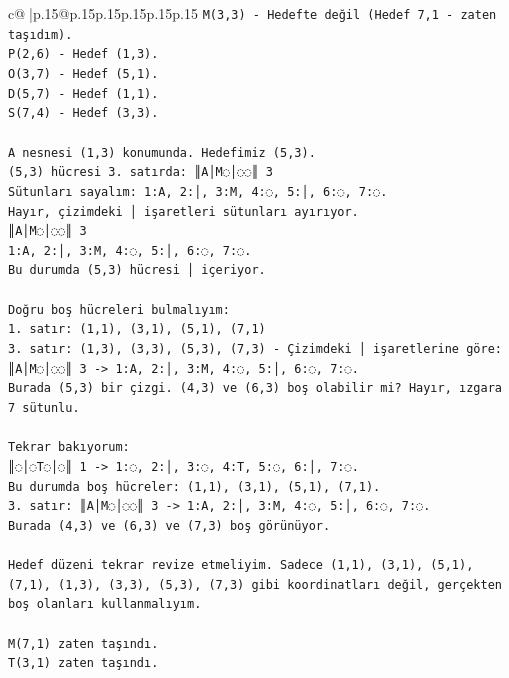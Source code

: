 \documentclass{article}
\begin{document}
{\begin{supertabular}{c@{$\;$}|p{.15\linewidth}@{}p{.15\linewidth}p{.15\linewidth}p{.15\linewidth}p{.15\linewidth}p{.15\linewidth}}
{{{\texttt{M(3,3) {-} Hedefte değil (Hedef 7,1 {-} zaten taşıdım).} \\
\texttt{P(2,6) {-} Hedef (1,3).} \\
\texttt{O(3,7) {-} Hedef (5,1).} \\
\texttt{D(5,7) {-} Hedef (1,1).} \\
\texttt{S(7,4) {-} Hedef (3,3).} \\
\\ 
\texttt{A nesnesi (1,3) konumunda. Hedefimiz (5,3).} \\
\texttt{(5,3) hücresi 3. satırda: ║A│M◌│◌◌║ 3} \\
\texttt{Sütunları sayalım: 1:A, 2:│, 3:M, 4:◌, 5:│, 6:◌, 7:◌.} \\
\texttt{Hayır, çizimdeki │ işaretleri sütunları ayırıyor.} \\
\texttt{║A│M◌│◌◌║ 3} \\
\texttt{1:A, 2:│, 3:M, 4:◌, 5:│, 6:◌, 7:◌.} \\
\texttt{Bu durumda (5,3) hücresi │ içeriyor.} \\
\\ 
\texttt{Doğru boş hücreleri bulmalıyım:} \\
\texttt{1. satır: (1,1), (3,1), (5,1), (7,1)} \\
\texttt{3. satır: (1,3), (3,3), (5,3), (7,3) {-} Çizimdeki │ işaretlerine göre:} \\
\texttt{║A│M◌│◌◌║ 3 {-}> 1:A, 2:│, 3:M, 4:◌, 5:│, 6:◌, 7:◌.} \\
\texttt{Burada (5,3) bir çizgi. (4,3) ve (6,3) boş olabilir mi? Hayır, ızgara 7 sütunlu.} \\
\\ 
\texttt{Tekrar bakıyorum:} \\
\texttt{║◌│◌T◌│◌║ 1 {-}> 1:◌, 2:│, 3:◌, 4:T, 5:◌, 6:│, 7:◌.} \\
\texttt{Bu durumda boş hücreler: (1,1), (3,1), (5,1), (7,1).} \\
\texttt{3. satır: ║A│M◌│◌◌║ 3 {-}> 1:A, 2:│, 3:M, 4:◌, 5:│, 6:◌, 7:◌.} \\
\texttt{Burada (4,3) ve (6,3) ve (7,3) boş görünüyor.} \\
\\ 
\texttt{Hedef düzeni tekrar revize etmeliyim. Sadece (1,1), (3,1), (5,1), (7,1), (1,3), (3,3), (5,3), (7,3) gibi koordinatları değil, gerçekten boş olanları kullanmalıyım.} \\
\\ 
\texttt{M(7,1) zaten taşındı.} \\
\texttt{T(3,1) zaten taşındı.} \\
}}}
\end{supertabular}}
\end{document}
